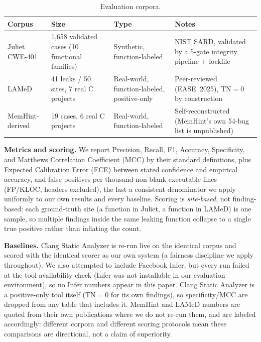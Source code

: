 \documentclass[11pt,a4paper]{article}
\begin{document}
\begin{table}[htbp]
\centering
\caption{Evaluation corpora.}
\label{tab:datasets}
\small
\begin{tabular}{@{}p{2.6cm}p{2.4cm}p{2.6cm}p{5.4cm}@{}}
\toprule
\textbf{Corpus} & \textbf{Size} & \textbf{Type} & \textbf{Notes} \\
\midrule
Juliet CWE-401~\cite{juliet} & 1{,}658 validated cases (10 functional families) & Synthetic, function-labeled & NIST SARD, validated by a 5-gate integrity pipeline + lockfile \\
LAMeD~\cite{lamed-benchmark} & 41 leaks / 50 sites, 7 real C projects & Real-world, function-labeled, positive-only & Peer-reviewed (EASE~2025), TN$=$0 by construction \\
MemHint-derived & 19 cases, 6 real C projects & Real-world, function-labeled & Self-reconstructed (MemHint's own 54-bug list is unpublished) \\
\bottomrule
\end{tabular}
\end{table}

\textbf{Metrics and scoring.} We report Precision, Recall, F1, Accuracy,
Specificity, and Matthews Correlation Coefficient (MCC) by their standard
definitions, plus Expected Calibration Error (ECE) between stated
confidence and empirical accuracy, and false positives per thousand
non-blank executable lines (FP/KLOC, headers excluded), the last a
consistent denominator we apply uniformly to our own results and every
baseline. Scoring is \emph{site-based}, not finding-based: each
ground-truth site (a function in Juliet, a function in LAMeD) is one
sample, so multiple findings inside the same leaking function collapse to
a single true positive rather than inflating the count.

\textbf{Baselines.} Clang Static Analyzer is re-run live on the
identical corpus and scored with the identical scorer as our own system
(a fairness discipline we apply throughout). We also attempted to include
Facebook Infer, but every run failed at the tool-availability check (Infer
was not installable in our evaluation environment), so no Infer numbers
appear in this paper. Clang Static Analyzer is a positive-only tool
itself (TN$=$0 for its own findings), so specificity/MCC are dropped
from any table that includes it. MemHint and LAMeD numbers are quoted
from their own publications where we do not re-run them, and are labeled
accordingly: different corpora and different scoring protocols mean these
comparisons are directional, not a claim of superiority.
\end{document}

